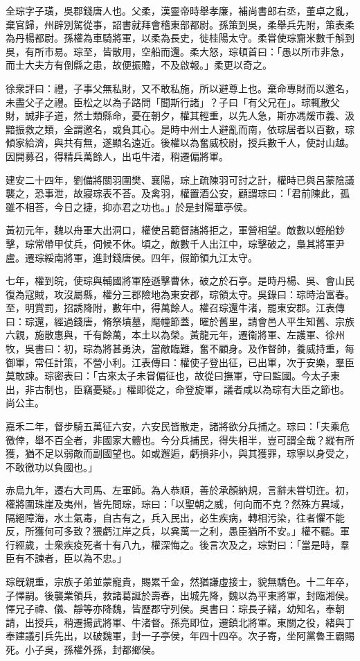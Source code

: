 
\begin{pinyinscope}
全琮字子璜，吳郡錢唐人也。父柔，漢靈帝時舉孝廉，補尚書郎右丞，董卓之亂，棄官歸，州辟別駕從事，詔書就拜會稽東部都尉。孫策到吳，柔舉兵先附，策表柔為丹楊都尉。孫權為車騎將軍，以柔為長史，徙桂陽太守。柔甞使琮齎米數千斛到吳，有所市易。琮至，皆散用，空船而還。柔大怒，琮頓首曰：「愚以所市非急，而士大夫方有倒縣之患，故便振贍，不及啟報。」柔更以奇之。

徐衆評曰：禮，子事父無私財，又不敢私施，所以避尊上也。棄命專財而以邀名，未盡父子之禮。臣松之以為子路問「聞斯行諸」？子曰「有父兄在」。琮輒散父財，誠非子道，然士類縣命，憂在朝夕，權其輕重，以先人急，斯亦馮煖市義、汲黯振救之類，全謂邀名，或負其心。是時中州士人避亂而南，依琮居者以百數，琮傾家給濟，與共有無，遂顯名遠近。後權以為奮威校尉，授兵數千人，使討山越。因開募召，得精兵萬餘人，出屯牛渚，稍遷偏將軍。

建安二十四年，劉備將關羽圍樊、襄陽，琮上疏陳羽可討之計，權時已與呂蒙陰議襲之，恐事泄，故寢琮表不荅。及禽羽，權置酒公安，顧謂琮曰：「君前陳此，孤雖不相荅，今日之捷，抑亦君之功也。」於是封陽華亭侯。

黃初元年，魏以舟軍大出洞口，權使呂範督諸將拒之，軍營相望。敵數以輕船鈔擊，琮常帶甲仗兵，伺候不休。頃之，敵數千人出江中，琮擊破之，梟其將軍尹盧。遷琮綏南將軍，進封錢唐侯。四年，假節領九江太守。

七年，權到皖，使琮與輔國將軍陸遜擊曹休，破之於石亭。是時丹楊、吳、會山民復為寇賊，攻沒屬縣，權分三郡險地為東安郡，琮領太守。吳錄曰：琮時治富春。至，明賞罰，招誘降附，數年中，得萬餘人。權召琮還牛渚，罷東安郡。江表傳曰：琮還，經過錢唐，脩祭墳墓，麾幢節蓋，曜於舊里，請會邑人平生知舊、宗族六親，施散惠與，千有餘萬，本土以為榮。黃龍元年，遷衞將軍、左護軍、徐州牧，吳書曰：初，琮為將甚勇決，當敵臨難，奮不顧身。及作督帥，養威持重，每御軍，常任計策，不營小利。江表傳曰：權使子登出征，已出軍，次于安樂，羣臣莫敢諫。琮密表曰：「古來太子未甞偏征也，故從曰撫軍，守曰監國。今太子東出，非古制也，臣竊憂疑。」權即從之，命登旋軍，議者咸以為琮有大臣之節也。尚公主。

嘉禾二年，督步騎五萬征六安，六安民皆散走，諸將欲分兵捕之。琮曰：「夫乘危徼倖，舉不百全者，非國家大體也。今分兵捕民，得失相半，豈可謂全哉？縱有所獲，猶不足以弱敵而副國望也。如或邂逅，虧損非小，與其獲罪，琮寧以身受之，不敢徼功以負國也。」

赤烏九年，遷右大司馬、左軍師。為人恭順，善於承顏納規，言辭未甞切迕。初，權將圍珠崖及夷州，皆先問琮，琮曰：「以聖朝之威，何向而不克？然殊方異域，隔絕障海，水土氣毒，自古有之，兵入民出，必生疾病，轉相污染，往者懼不能反，所獲何可多致？猥虧江岸之兵，以兾萬一之利，愚臣猶所不安。」權不聽。軍行經歲，士衆疾疫死者十有八九，權深悔之。後言次及之，琮對曰：「當是時，羣臣有不諫者，臣以為不忠。」

琮旣親重，宗族子弟並蒙寵貴，賜累千金，然猶謙虛接士，貌無驕色。十二年卒，子懌嗣。後襲業領兵，救諸葛誕於壽春，出城先降，魏以為平東將軍，封臨湘侯。懌兄子禕、儀、靜等亦降魏，皆歷郡守列侯。吳書曰：琮長子緒，幼知名，奉朝請，出授兵，稍遷揚武將軍、牛渚督。孫亮即位，遷鎮北將軍。東關之役，緒與丁奉建議引兵先出，以破魏軍，封一子亭侯，年四十四卒。次子寄，坐阿黨魯王霸賜死。小子吳，孫權外孫，封都鄉侯。


\end{pinyinscope}